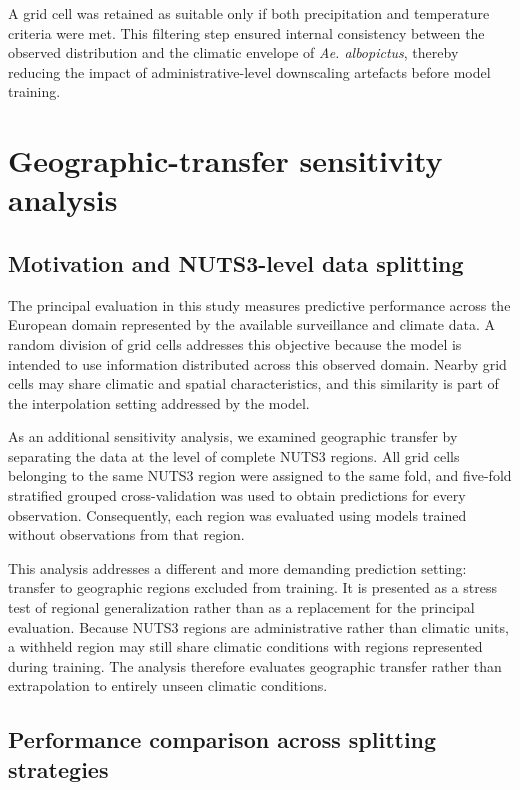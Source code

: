 \documentclass[11pt,a4paper]{article}
\begin{document}
A grid cell was retained as suitable only if both precipitation and temperature criteria were met. This filtering step ensured internal consistency between the observed distribution and the climatic envelope of \emph{Ae. albopictus}, thereby reducing the impact of administrative-level downscaling artefacts before model training.

\section{Geographic-transfer sensitivity analysis}
\label{sec:si_spatial}

\subsection{Motivation and NUTS3-level data splitting}

The principal evaluation in this study measures predictive performance across the European domain represented by the available surveillance and climate data. A random division of grid cells addresses this objective because the model is intended to use information distributed across this observed domain. Nearby grid cells may share climatic and spatial characteristics, and this similarity is part of the interpolation setting addressed by the model.

As an additional sensitivity analysis, we examined geographic transfer by separating the data at the level of complete NUTS3 regions. All grid cells belonging to the same NUTS3 region were assigned to the same fold, and five-fold stratified grouped cross-validation was used to obtain predictions for every observation. Consequently, each region was evaluated using models trained without observations from that region.

This analysis addresses a different and more demanding prediction setting: transfer to geographic regions excluded from training. It is presented as a stress test of regional generalization rather than as a replacement for the principal evaluation. Because NUTS3 regions are administrative rather than climatic units, a withheld region may still share climatic conditions with regions represented during training. The analysis therefore evaluates geographic transfer rather than extrapolation to entirely unseen climatic conditions.

\subsection{Performance comparison across splitting strategies}
\end{document}
